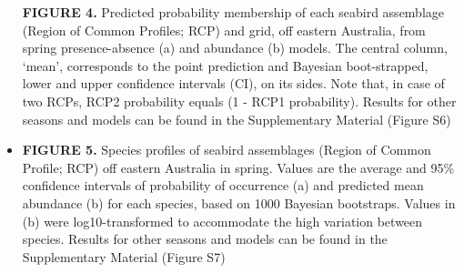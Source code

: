 \documentclass{article}
\begin{document}
\begin{linenumbers}
\begin{itemize}
  \textbf{FIGURE 4.} Predicted probability membership of each seabird assemblage (Region of Common Profiles; RCP) and grid, off eastern Australia, from spring presence-absence (a) and abundance (b) models. The central column, `mean', corresponds to the point prediction and Bayesian boot-strapped, lower and upper confidence intervals (CI), on its sides. Note that, in case of two RCPs, RCP2 probability equals (1 - RCP1 probability). Results for other seasons and models can be found in the Supplementary Material (Figure S6)
\item
  \textbf{FIGURE 5.} Species profiles of seabird assemblages (Region of Common Profile; RCP) off eastern Australia in spring. Values are the average and 95\% confidence intervals of probability of occurrence (a) and predicted mean abundance (b) for each species, based on 1000 Bayesian bootstraps. Values in (b) were log10-transformed to accommodate the high variation between species. Results for other seasons and models can be found in the Supplementary Material (Figure S7)
\end{itemize}

\end{linenumbers}
\end{document}
